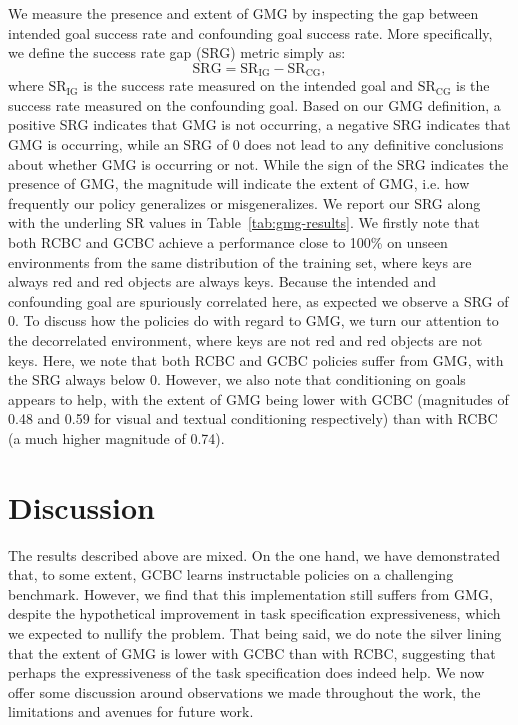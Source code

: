 \documentclass[../main.tex]{subfiles}
\begin{document}
We measure the presence and extent of GMG by inspecting the gap between intended goal success rate
and confounding goal success rate. More specifically, we define the success rate gap (SRG) metric
simply as:
\begin{equation}
	\text{SRG} = \text{SR}_\text{IG} - \text{SR}_\text{CG},
\end{equation}
where $\text{SR}_\text{IG}$ is the success rate measured on the intended goal and
$\text{SR}_\text{CG}$ is the success rate measured on the confounding goal. Based on our GMG
definition, a positive SRG indicates that GMG is not occurring, a negative SRG indicates that GMG is
occurring, while an SRG of 0 does not lead to any definitive conclusions about whether GMG is
occurring or not. While the sign of the SRG indicates the presence of GMG, the magnitude will
indicate the extent of GMG, i.e. how frequently our policy generalizes or misgeneralizes. We report
our SRG along with the underling SR values in Table~\ref{tab:gmg-results}. We firstly note that both
RCBC and GCBC achieve a performance close to 100\% on unseen environments from the same distribution
of the training set, where keys are always red and red objects are always keys. Because the intended
and confounding goal are spuriously correlated here, as expected we observe a SRG of 0. To discuss
how the policies do with regard to GMG, we turn our attention to the decorrelated environment, where
keys are not red and red objects are not keys. Here, we note that both RCBC and GCBC policies suffer
from GMG, with the SRG always below 0. However, we also note that conditioning on goals appears to
help, with the extent of GMG being lower with GCBC (magnitudes of 0.48 and 0.59 for visual and
textual conditioning respectively) than with RCBC (a much higher magnitude of 0.74).

\section{Discussion}\label{exp:sec:discussion}

The results described above are mixed. On the one hand, we have demonstrated that, to some extent,
GCBC learns instructable policies on a challenging benchmark. However, we find that this
implementation still suffers from GMG, despite the hypothetical improvement in task specification
expressiveness, which we expected to nullify the problem. That being said, we do note the silver
lining that the extent of GMG is lower with GCBC than with RCBC, suggesting that perhaps the
expressiveness of the task specification does indeed help. We now offer some discussion around
observations we made throughout the work, the limitations and avenues for future work.
\end{document}
